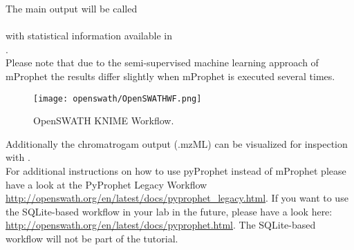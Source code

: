\begin{comment}
\noindent If you have a valid python installation, pyProphet can be used. Further instructions the installation of python can be found in the pyOpenMS section. 

\noindent Installation of the current stable version:
\begin{code}
\begin{verbatim}
pip install pyprophet
\end{verbatim}
\end{code}

\noindent The following command should provide similar results to the mProphet script:
\begin{code}
\begin{verbatim}
pyprophet score --in OpenSWATH_quant.tsv --out OpenSWATH_quant_scoring.tsv --group_id transition_group_id --pi0_lambda 1e-6 1e-2 1e-6
\end{verbatim}
\end{code}
\end{comment}

\noindent The main output will be called\\
\\
with statistical information available in\\
.\\

\noindent Please note that due to the semi-supervised machine learning approach of mProphet the results differ slightly when mProphet is executed several times. \\

\begin{figure}[!ht]
  \texttt{[image: openswath/OpenSWATHWF.png]}
  \caption{OpenSWATH KNIME Workflow.}
  \label{fig:openswath}
\end{figure}

\noindent Additionally the chromatrogam output (.mzML) can be visualized for inspection with . \\

\noindent For additional instructions on how to use pyProphet instead of mProphet please have a look at the PyProphet Legacy Workflow \url{http://openswath.org/en/latest/docs/pyprophet_legacy.html}. If you want to use the SQLite-based workflow in your lab in the future, please have a look here: \url{http://openswath.org/en/latest/docs/pyprophet.html}. The SQLite-based workflow will not be part of the tutorial. \\


